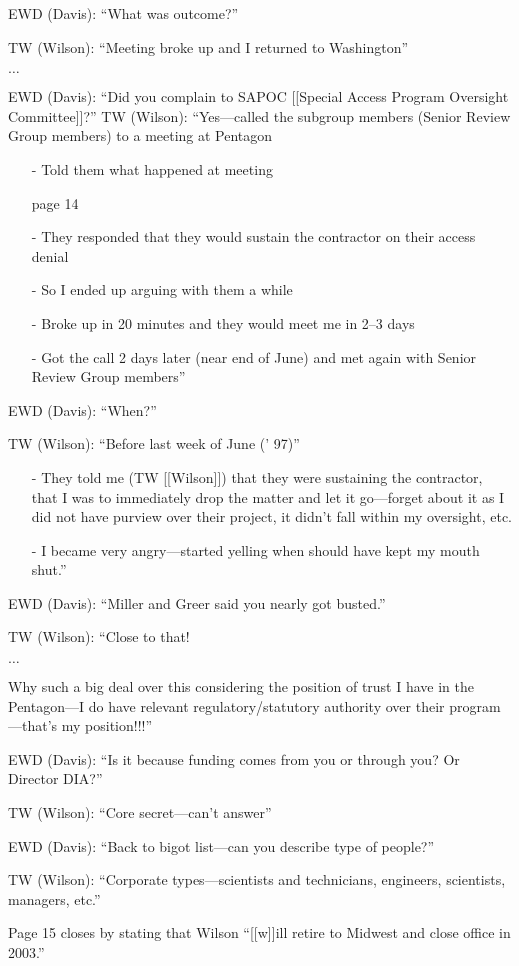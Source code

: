 \begin{svgraybox}
\noindent EWD (Davis): ``What was outcome?''

\noindent TW (Wilson): ``Meeting broke up and I returned to Washington''

$\ldots$

\noindent EWD (Davis): ``Did you complain to SAPOC [[Special Access Program Oversight Committee]]?''
\noindent TW (Wilson): ``Yes---called the subgroup members (Senior Review Group members) to a meeting at Pentagon
\begin{enumerate}
\item[-]
Told them what happened at meeting
\item[]page 14
\item[-]
They responded that they would sustain the contractor on their access denial
\item[-]
So I ended up arguing with them a while
\item[-]
Broke up in 20 minutes and they would meet me in 2--3 days
\item[-]
Got the call 2 days later (near end of June) and met again with Senior Review Group members''
\end{enumerate}

\noindent EWD (Davis): ``When?''

\noindent TW (Wilson): ``Before last week of June (' 97)''
\begin{enumerate}
\item[-]  They told me (TW [[Wilson]]) that they were sustaining the contractor, that I was to
immediately drop the matter and let it go---forget about it as I did not have
purview over their project, it didn't fall within my oversight, etc.
\item[-]  I became very angry---started yelling when should have kept my mouth shut.''
\end{enumerate}

\noindent EWD (Davis): ``Miller and Greer said you nearly got busted.''

\noindent TW (Wilson): ``Close to that!

$\ldots$

Why such a big deal over this considering the position of trust I have in the
Pentagon---I do have relevant regulatory/statutory authority over their program---that's my position!!!''

\noindent EWD (Davis): ``Is it because funding comes from you or through you? Or Director DIA?''

\noindent TW (Wilson): ``Core secret---can't answer''

\noindent EWD (Davis): ``Back to bigot list---can you describe type of people?''

\noindent TW (Wilson): ``Corporate types---scientists and technicians, engineers, scientists, managers, etc.''

Page 15 closes by stating that Wilson ``[[w]]ill retire to Midwest and close office in 2003.''
\end{svgraybox}

